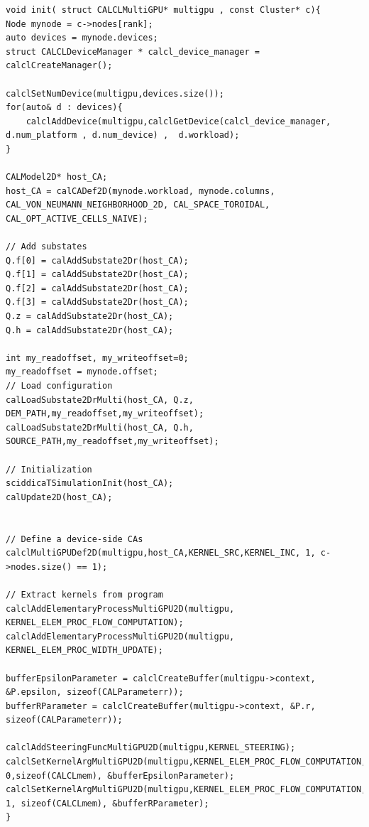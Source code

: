\begin{lstlisting}
void init( struct CALCLMultiGPU* multigpu , const Cluster* c){
Node mynode = c->nodes[rank];
auto devices = mynode.devices;
struct CALCLDeviceManager * calcl_device_manager = calclCreateManager();

calclSetNumDevice(multigpu,devices.size());
for(auto& d : devices){
	calclAddDevice(multigpu,calclGetDevice(calcl_device_manager, d.num_platform , d.num_device) ,  d.workload);
}

CALModel2D* host_CA;
host_CA = calCADef2D(mynode.workload, mynode.columns, CAL_VON_NEUMANN_NEIGHBORHOOD_2D, CAL_SPACE_TOROIDAL, CAL_OPT_ACTIVE_CELLS_NAIVE);

// Add substates
Q.f[0] = calAddSubstate2Dr(host_CA);
Q.f[1] = calAddSubstate2Dr(host_CA);
Q.f[2] = calAddSubstate2Dr(host_CA);
Q.f[3] = calAddSubstate2Dr(host_CA);
Q.z = calAddSubstate2Dr(host_CA);
Q.h = calAddSubstate2Dr(host_CA);

int my_readoffset, my_writeoffset=0;
my_readoffset = mynode.offset;
// Load configuration
calLoadSubstate2DrMulti(host_CA, Q.z, DEM_PATH,my_readoffset,my_writeoffset);
calLoadSubstate2DrMulti(host_CA, Q.h, SOURCE_PATH,my_readoffset,my_writeoffset);

// Initialization
sciddicaTSimulationInit(host_CA);
calUpdate2D(host_CA);


// Define a device-side CAs
calclMultiGPUDef2D(multigpu,host_CA,KERNEL_SRC,KERNEL_INC, 1, c->nodes.size() == 1);

// Extract kernels from program
calclAddElementaryProcessMultiGPU2D(multigpu, KERNEL_ELEM_PROC_FLOW_COMPUTATION);
calclAddElementaryProcessMultiGPU2D(multigpu, KERNEL_ELEM_PROC_WIDTH_UPDATE);

bufferEpsilonParameter = calclCreateBuffer(multigpu->context, &P.epsilon, sizeof(CALParameterr));
bufferRParameter = calclCreateBuffer(multigpu->context, &P.r, sizeof(CALParameterr));

calclAddSteeringFuncMultiGPU2D(multigpu,KERNEL_STEERING);
calclSetKernelArgMultiGPU2D(multigpu,KERNEL_ELEM_PROC_FLOW_COMPUTATION, 0,sizeof(CALCLmem), &bufferEpsilonParameter);
calclSetKernelArgMultiGPU2D(multigpu,KERNEL_ELEM_PROC_FLOW_COMPUTATION, 1, sizeof(CALCLmem), &bufferRParameter);
}
\end{lstlisting}


